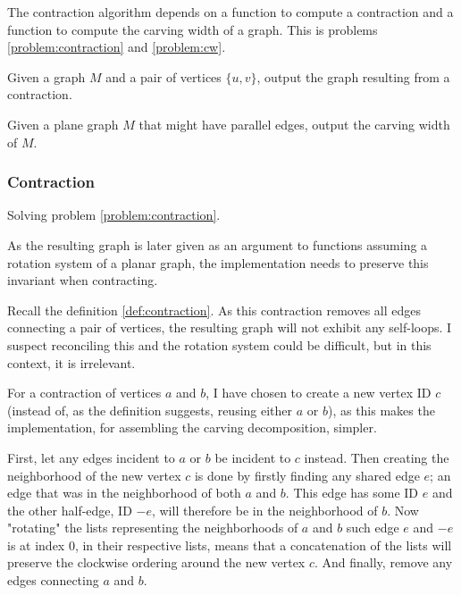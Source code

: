 \documentclass{article}
\begin{document}

		The contraction algorithm depends on a function to compute a contraction and a function to compute the carving width of a graph. This is problems \ref{problem:contraction} and \ref{problem:cw}.

		\begin{problem}\label{problem:contraction}
			Given a graph $M$ and a pair of vertices $\{u, v\}$, output the graph resulting from a contraction.
		\end{problem}

		\begin{problem}\label{problem:cw}
			Given a plane graph $M$ that might have parallel edges, output the carving width of $M$.
		\end{problem}

		\subsubsection{Contraction}

			Solving problem \ref{problem:contraction}.

			As the resulting graph is later given as an argument to functions assuming a rotation system of a planar graph, the implementation needs to preserve this invariant when contracting.

			Recall the definition \ref{def:contraction}. As this contraction removes all edges connecting a pair of vertices, the resulting graph will not exhibit any self-loops. I suspect reconciling this and the rotation system could be difficult, but in this context, it is irrelevant.

			For a contraction of vertices $a$ and $b$, I have chosen to create a new vertex ID $c$ (instead of, as the definition suggests, reusing either $a$ or $b$), as this makes the implementation, for assembling the carving decomposition, simpler.

			First, let any edges incident to $a$ or $b$ be incident to $c$ instead. Then creating the neighborhood of the new vertex $c$ is done by firstly finding any shared edge $e$; an edge that was in the neighborhood of both $a$ and $b$. This edge has some ID $e$ and the other half-edge, ID $-e$, will therefore be in the neighborhood of $b$. Now "rotating" the lists representing the neighborhoods of $a$ and $b$ such edge $e$ and $-e$ is at index 0, in their respective lists, means that a concatenation of the lists will preserve the clockwise ordering around the new vertex $c$. And finally, remove any edges connecting $a$ and $b$.
			
\end{document}
